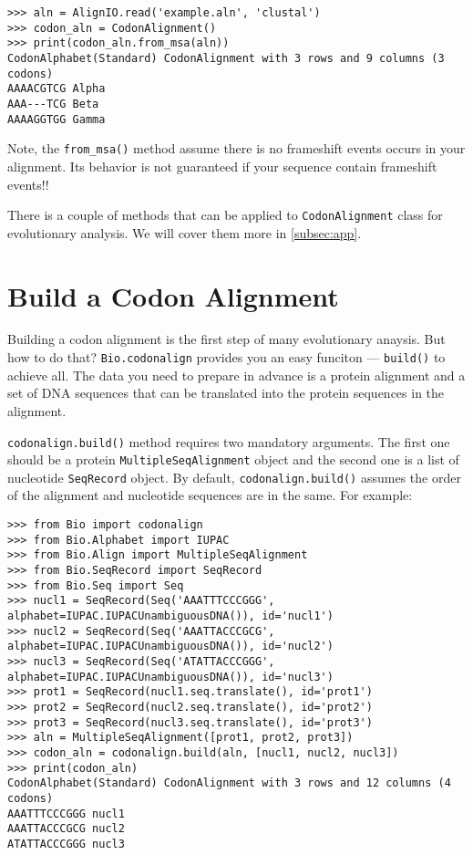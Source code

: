 \begin{verbatim}
>>> aln = AlignIO.read('example.aln', 'clustal')
>>> codon_aln = CodonAlignment()
>>> print(codon_aln.from_msa(aln))
CodonAlphabet(Standard) CodonAlignment with 3 rows and 9 columns (3 codons)
AAAACGTCG Alpha
AAA---TCG Beta
AAAAGGTGG Gamma
\end{verbatim}

Note, the \verb|from_msa()| method assume there is no frameshift
events occurs in your alignment. Its behavior is not guaranteed if your
sequence contain frameshift events!!

There is a couple of methods that can be applied to
\verb|CodonAlignment| class for evolutionary analysis. We will cover
them more in \ref{subsec:app}.

\section{Build a Codon Alignment}

Building a codon alignment is the first step of many evolutionary
anaysis. But how to do that? \verb|Bio.codonalign| provides you an
easy funciton --- \verb|build()| to achieve all. The data you need to
prepare in advance is a protein alignment and a set of DNA sequences
that can be translated into the protein sequences in the alignment.

\verb|codonalign.build()| method requires two mandatory arguments. The
first one should be a protein \verb|MultipleSeqAlignment| object and
the second one is a list of nucleotide \verb|SeqRecord| object. By
default, \verb|codonalign.build()| assumes the order of the alignment
and nucleotide sequences are in the same. For example:

\begin{verbatim}
>>> from Bio import codonalign
>>> from Bio.Alphabet import IUPAC
>>> from Bio.Align import MultipleSeqAlignment
>>> from Bio.SeqRecord import SeqRecord
>>> from Bio.Seq import Seq
>>> nucl1 = SeqRecord(Seq('AAATTTCCCGGG', alphabet=IUPAC.IUPACUnambiguousDNA()), id='nucl1')
>>> nucl2 = SeqRecord(Seq('AAATTACCCGCG', alphabet=IUPAC.IUPACUnambiguousDNA()), id='nucl2')
>>> nucl3 = SeqRecord(Seq('ATATTACCCGGG', alphabet=IUPAC.IUPACUnambiguousDNA()), id='nucl3')
>>> prot1 = SeqRecord(nucl1.seq.translate(), id='prot1')
>>> prot2 = SeqRecord(nucl2.seq.translate(), id='prot2')
>>> prot3 = SeqRecord(nucl3.seq.translate(), id='prot3')
>>> aln = MultipleSeqAlignment([prot1, prot2, prot3])
>>> codon_aln = codonalign.build(aln, [nucl1, nucl2, nucl3])
>>> print(codon_aln)
CodonAlphabet(Standard) CodonAlignment with 3 rows and 12 columns (4 codons)
AAATTTCCCGGG nucl1
AAATTACCCGCG nucl2
ATATTACCCGGG nucl3
\end{verbatim}


